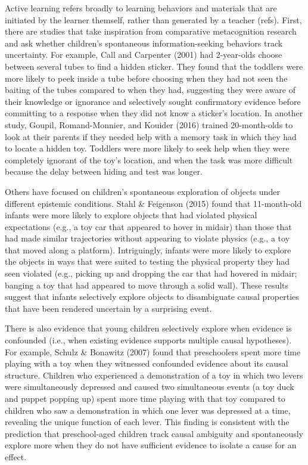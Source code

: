 \documentclass[a4paper,man,apacite,floatsintext]{apa6}
\begin{document}
Active learning refers broadly to learning behaviors and materials that
are initiated by the learner themself, rather than generated by a
teacher (refs). First, there are studies that take inspiration from
comparative metacognition research and ask whether children's
spontaneous information-seeking behaviors track uncertainty. For
example, Call and Carpenter (2001) had 2-year-olds choose between
several tubes to find a hidden sticker. They found that the toddlers
were more likely to peek inside a tube before choosing when they had not
seen the baiting of the tubes compared to when they had, suggesting they
were aware of their knowledge or ignorance and selectively sought
confirmatory evidence before committing to a response when they did not
know a sticker's location. In another study, Goupil, Romand-Monnier, and
Kouider (2016) trained 20-month-olds to look at their parents if they
needed help with a memory task in which they had to locate a hidden toy.
Toddlers were more likely to seek help when they were completely
ignorant of the toy's location, and when the task was more difficult
because the delay between hiding and test was longer.

Others have focused on children's spontaneous exploration of objects
under different epistemic conditions. Stahl \& Feigenson (2015) found
that 11-month-old infants were more likely to explore objects that had
violated physical expectations (e.g., a toy car that appeared to hover
in midair) than those that had made similar trajectories without
appearing to violate physics (e.g., a toy that moved along a platform).
Intriguingly, infants were more likely to explore the objects in ways
that were suited to testing the physical property they had seen violated
(e.g., picking up and dropping the car that had hovered in midair;
banging a toy that had appeared to move through a solid wall). These
results suggest that infants selectively explore objects to disambiguate
causal properties that have been rendered uncertain by a surprising
event.

There is also evidence that young children selectively explore when
evidence is confounded (i.e., when existing evidence supports multiple
causal hypotheses). For example, Schulz \& Bonawitz (2007) found that
preschoolers spent more time playing with a toy when they witnessed
confounded evidence about its causal structure. Children who experienced
a demonstration of a toy in which two levers were simultaneously
depressed and caused two simultaneous events (a toy duck and puppet
popping up) spent more time playing with that toy compared to children
who saw a demonstration in which one lever was depressed at a time,
revealing the unique function of each lever. This finding is consistent
with the prediction that preschool-aged children track causal ambiguity
and spontaneously explore more when they do not have sufficient evidence
to isolate a cause for an effect.
\end{document}
